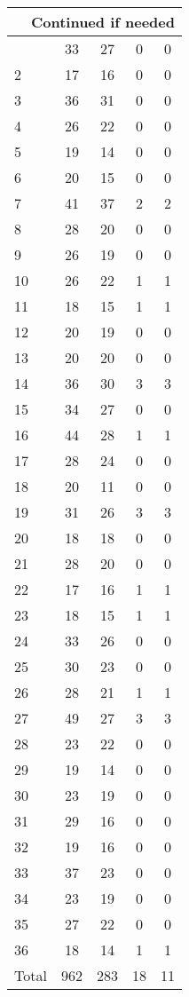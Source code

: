 \begin{center}
\begin{longtable}{l|c|c|c|c}
\hline \multicolumn{5}{|r|}{{Continued if needed}} \\ \hline
\endfoot 
1 & 33 & 27 & 0 & 0\\ \hline
2 & 17 & 16 & 0 & 0\\ \hline
3 & 36 & 31 & 0 & 0\\ \hline
4 & 26 & 22 & 0 & 0\\ \hline
5 & 19 & 14 & 0 & 0\\ \hline
6 & 20 & 15 & 0 & 0\\ \hline
7 & 41 & 37 & 2 & 2\\ \hline
8 & 28 & 20 & 0 & 0\\ \hline
9 & 26 & 19 & 0 & 0\\ \hline
10 & 26 & 22 & 1 & 1\\ \hline
11 & 18 & 15 & 1 & 1\\ \hline
12 & 20 & 19 & 0 & 0\\ \hline
13 & 20 & 20 & 0 & 0\\ \hline
14 & 36 & 30 & 3 & 3\\ \hline
15 & 34 & 27 & 0 & 0\\ \hline
16 & 44 & 28 & 1 & 1\\ \hline
17 & 28 & 24 & 0 & 0\\ \hline
18 & 20 & 11 & 0 & 0\\ \hline
19 & 31 & 26 & 3 & 3\\ \hline
20 & 18 & 18 & 0 & 0\\ \hline
21 & 28 & 20 & 0 & 0\\ \hline
22 & 17 & 16 & 1 & 1\\ \hline
23 & 18 & 15 & 1 & 1\\ \hline
24 & 33 & 26 & 0 & 0\\ \hline
25 & 30 & 23 & 0 & 0\\ \hline
26 & 28 & 21 & 1 & 1\\ \hline
27 & 49 & 27 & 3 & 3\\ \hline
28 & 23 & 22 & 0 & 0\\ \hline
29 & 19 & 14 & 0 & 0\\ \hline
30 & 23 & 19 & 0 & 0\\ \hline
31 & 29 & 16 & 0 & 0\\ \hline
32 & 19 & 16 & 0 & 0\\ \hline
33 & 37 & 23 & 0 & 0\\ \hline
34 & 23 & 19 & 0 & 0\\ \hline
35 & 27 & 22 & 0 & 0\\ \hline
36 & 18 & 14 & 1 & 1\\ \hline
\hline \hline
Total & 962 & 283 & 18 & 11



\end{longtable}
\end{center}

